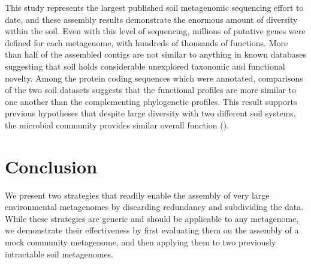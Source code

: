 \documentclass[11pt]{article} %
\begin{document}

This study represents the largest published soil metagenomic sequencing effort
to date, and these assembly results demonstrate the enormous amount of
diversity within the soil.  Even with this level of sequencing,
millions of putative genes were defined for each metagenome, with
hundreds of thousands of functions.
More than half of the assembled contigs are not similar to anything in
known databases suggesting that soil holds considerable unexplored
taxonomic and functional novelty.
Among the
protein coding sequences which were annotated, comparisons of the two
soil datasets suggests that the functional profiles are more similar
to one another than the complementing phylogenetic profiles.  This
result supports previous hypotheses that despite large diversity with
two different soil systems, the microbial community provides similar
overall function (\cite{Girvan:2005jv,McGradySteed:1997uj,Muller:2002cd,Konstantinidis:2004hr}).

\section{Conclusion}

We present two strategies that readily enable the assembly of very
large environmental metagenomes by discarding redundancy and
subdividing the data.  While these strategies are generic and should
be applicable to any metagenome, we demonstrate their effectiveness by
first evaluating them on the assembly of a mock community metagenome,
and then applying them to two previously intractable soil metagenomes.
\end{document}
